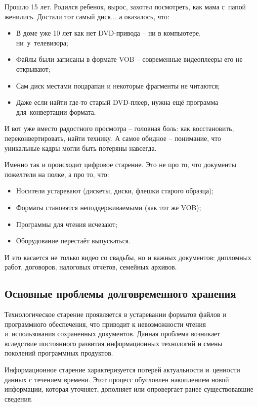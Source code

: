 \documentclass{ou}
\begin{document}
Прошло 15 лет. Родился ребенок, вырос, захотел посмотреть, как мама с~папой женились. Достали тот самый диск... а оказалось, что:
\begin{itemize}[label=-, leftmargin=0em, itemindent=3.35em, nosep]
\item В доме уже 10 лет как нет DVD-привода -- ни в компьютере, ни~у~телевизора;
\item Файлы были записаны в формате VOB -- современные видеоплееры его не открывают;
\item Сам диск местами поцарапан и некоторые фрагменты не читаются;
\item Даже если найти где-то старый DVD-плеер, нужна ещё программа для~конвертации формата.
\end{itemize}

И вот уже вместо радостного просмотра -- головная боль: как восстановить, переконвертировать, найти технику. А самое обидное -- понимание, что уникальные кадры могли быть потеряны навсегда.

Именно так и происходит цифровое старение. Это не про то, что документы пожелтели на полке, а про то, что:
\begin{itemize}[label=-, leftmargin=0em, itemindent=3.35em, nosep]
\item Носители устаревают (дискеты, диски, флешки старого образца);
\item Форматы становятся неподдерживаемыми (как тот же VOB);
\item Программы для чтения исчезают;
\item Оборудование перестаёт выпускаться.
\end{itemize}

И это касается не только видео со свадьбы, но и важных документов: дипломных работ, договоров, налоговых отчётов, семейных архивов.
\subsection{Основные проблемы долговременного хранения}
Технологическое старение проявляется в устаревании форматов файлов и программного обеспечения, что приводит к невозможности чтения и~использования сохраненных документов. Данная проблема возникает вследствие постоянного развития информационных технологий и смены поколений программных продуктов.

Информационное старение характеризуется потерей актуальности и~ценности данных с течением времени. Этот процесс обусловлен накоплением новой информации, которая уточняет, дополняет или опровергает ранее существовавшие сведения.
\end{document}
